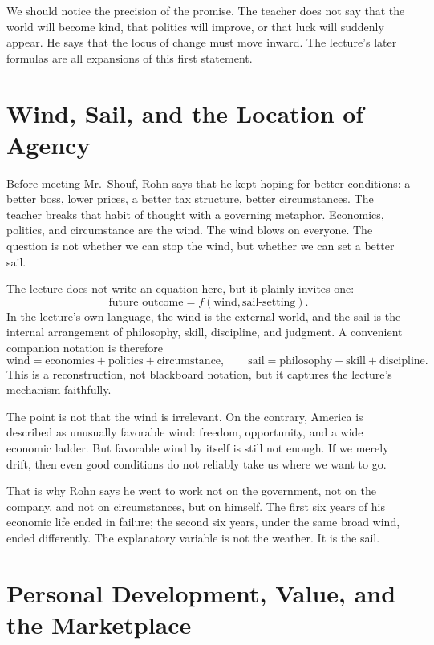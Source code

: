We should notice the precision of the promise. The teacher does not say that the world will become kind, that politics will improve, or that luck will suddenly appear. He says that the locus of change must move inward. The lecture's later formulas are all expansions of this first statement.

\section{Wind, Sail, and the Location of Agency}

Before meeting Mr.~Shouf, Rohn says that he kept hoping for better conditions: a better boss, lower prices, a better tax structure, better circumstances. The teacher breaks that habit of thought with a governing metaphor. Economics, politics, and circumstance are the wind. The wind blows on everyone. The question is not whether we can stop the wind, but whether we can set a better sail.

The lecture does not write an equation here, but it plainly invites one:
\begin{equation}
\text{future outcome} = f(\text{wind},\text{sail-setting}).
\end{equation}
In the lecture's own language, the wind is the external world, and the sail is the internal arrangement of philosophy, skill, discipline, and judgment. A convenient companion notation is therefore
\begin{equation}
\text{wind} = \text{economics}+\text{politics}+\text{circumstance}, \qquad
\text{sail} = \text{philosophy}+\text{skill}+\text{discipline}.
\end{equation}
This is a reconstruction, not blackboard notation, but it captures the lecture's mechanism faithfully.

The point is not that the wind is irrelevant. On the contrary, America is described as unusually favorable wind: freedom, opportunity, and a wide economic ladder. But favorable wind by itself is still not enough. If we merely drift, then even good conditions do not reliably take us where we want to go.

That is why Rohn says he went to work not on the government, not on the company, and not on circumstances, but on himself. The first six years of his economic life ended in failure; the second six years, under the same broad wind, ended differently. The explanatory variable is not the weather. It is the sail.

\section{Personal Development, Value, and the Marketplace}

